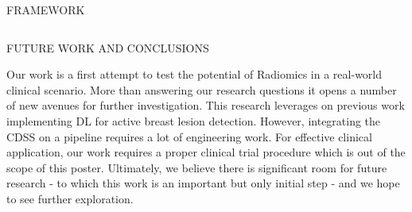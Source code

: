 \documentclass[final]{beamer}
\begin{document}
\begin{frame}[t, fragile = singleslide]{}
\begin{columns}[t]
\begin{column}{0.945\textwidth}
\begin{block}{FRAMEWORK}
\end{block}

\end{column}

\end{columns}

\hfill

\begin{columns}[t]

\begin{column}{0.45\textwidth}

\begin{block}{FUTURE WORK AND CONCLUSIONS}

Our work is a first attempt to test the potential of Radiomics in a real-world clinical scenario.
More than answering our research questions it opens a number of new avenues for further investigation.
This research leverages on previous work implementing DL for active breast lesion detection.
However, integrating the CDSS on a pipeline requires a lot of engineering work.
For effective clinical application, our work requires a proper clinical trial procedure which is out of the scope of this poster.
Ultimately, we believe there is significant room for future research - to which this work is an important but only initial step - and we hope to see further exploration.

\end{block}

\vspace{10mm}


\end{column}
\end{columns}
\end{frame}
\end{document}
